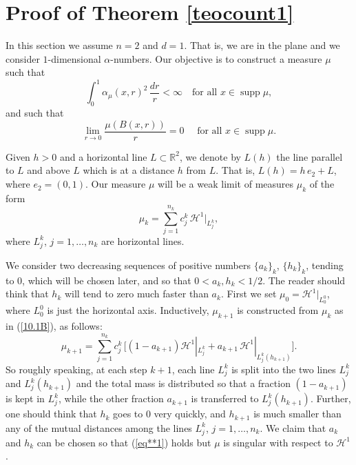 \documentclass[11pt]{amsart}
\newcommand{\R}{{\mathbb R}}       %
\newcommand{\HH}{{\mathcal H}}
\newcommand{\rf}[1]{{(\ref{#1})}}
\newcommand{\supp}{\operatorname{supp}}
\newcommand{\vv}{{\vspace{2mm}}}
\theoremstyle{definition}
\theoremstyle{remark}
\numberwithin{equation}{section}
\begin{document}
\vv



\section{Proof of Theorem \ref{teocount1}}

In this section we assume $n=2$ and $d=1$. That is, we are in the plane and we consider $1$-dimensional $\alpha$-numbers.
Our objective is to construct a measure $\mu$ such that
	\begin{equation}\label{eq**1}
	\int_0^1\alpha_\mu(x,r)^2\,\frac{dr}r<\infty\quad \mbox{for all $x\in \supp\mu$},
	\end{equation}
	and such that 
	\begin{equation}\label{10.1A}
	\lim_{r\to 0}\frac{\mu(B(x,r))}r =0\quad\mbox{ for all $x\in\supp\mu$.}
	\end{equation}

Given $h>0$ and a horizontal line $L\subset\R^2$, we denote by $L(h)$ the line parallel to $L$ and above $L$ which is at a distance $h$ from $L$. That is, $L(h) = h\,e_2+ L$, where $e_2=(0,1)$.
Our measure $\mu$ will be a weak limit of measures $\mu_k$ of the form
\begin{equation}\label{10.1B}
\mu_k=\sum_{j=1}^{n_k} c_j^k \,\HH^1|_{L_j^k},
\end{equation}
where $L_j^k$, $j=1,\ldots,n_k$ are horizontal lines.

We consider two decreasing sequences of positive numbers $\{a_k\}_k$, $\{h_k\}_k$, tending to $0$, which will be chosen later, and so that $0<a_k,h_k<1/2$. The reader should think that $h_k$ will tend to zero much faster than $a_k$.
First we set $\mu_0 = \HH^1|_{L_0^0}$, where $L_0^0$ is just the horizontal axis. Inductively, $\mu_{k+1}$ is constructed from $\mu_k$ as in \rf{10.1B}, as follows:
\begin{equation}\label{def-mk}
\mu_{k+1} = \sum_{j=1}^{n_k} c_j^k \,\bigl[(1-a_{k+1}) \HH^1|_{L_j^k} + a_{k+1}\,\HH^1|_{L_j^k(h_{k+1})}\bigr]
.\end{equation}
So roughly speaking, at each step $k+1$, each line $L_j^k$ is split into the two lines $L_j^k$ and 
$L_j^k(h_{k+1})$ and the total mass is distributed so that a fraction $(1-a_{k+1})$ is kept in $L_j^k$, while the other fraction $a_{k+1}$ is transferred to $L_j^k(h_{k+1})$. Further, one should think that $h_k$ goes to $0$ 
very quickly, and $h_{k+1}$ is much smaller than any of the mutual distances among the lines $L_j^k$, $j=1,\ldots,n_k$.
We claim that $a_k$ and $h_k$ can be chosen so that \rf{eq**1} holds but $\mu$ is singular with respect to
$\HH^1$.
\end{document}
